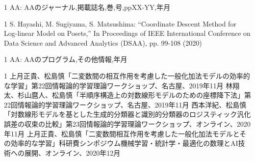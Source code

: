 \begin{雑誌論文}{1}
AA:
AAのジャーナル,掲載誌名,巻,号,ppXX-YY,年月
\end{雑誌論文}
\fi
\begin{査読付}{1}
S. Hayashi, M. Sugiyama, S. Matsushima: “Coordinate Descent Method for Log-linear Model on Posets,”  In Proceedings of IEEE International Conference on Data Science and Advanced Analytics (DSAA), pp. 99-108 (2020)
\end{査読付}

\begin{公開}{1}
AA:
AAのプログラム,その他情報,年月
\end{公開}

\begin{発表}{1}
 上月正貴、松島慎「二変数間の相互作用を考慮した一般化加法モデルの効率的な学習」第22回情報論的学習理論ワークショップ、名古屋、2019年11月
 林翔太、杉山麿人、松島慎「半順序構造上の対数線形モデルのための座標降下法」第22回情報論的学習理論ワークショップ、名古屋、2019年11月
 西本洋紀、松島慎「対数線形モデルを基とした生成的分類器と識別的分類器のロジスティック汎化誤差の収束の比較」第23回情報論的学習理論ワークショップ、オンライン、2020年11月
 上月正貴、松島慎「二変数間相互作用を考慮した一般化加法モデルとその効率的な学習」科研費シンポジウム機械学習・統計学・最適化の数理とAI技術への展開、オンライン、2020年12月
\end{発表}

